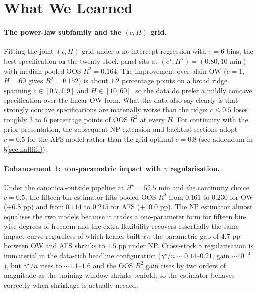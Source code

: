 \documentclass[11pt,a4paper]{article}
\begin{document}
\section{What We Learned}\label{sec:conc}

\paragraph{The power-law subfamily and the $(c, H)$ grid.}
Fitting the joint $(c, H)$ grid under a no-intercept regression with
$\tau = 6$ bins, the best specification on the twenty-stock panel sits
at $(c^\star, H^\star) = (0.80, 10 \text{ min})$ with median pooled OOS
$R^2 = 0.164$.  The improvement over plain OW ($c = 1$, $H = 60$ gives
$R^2 = 0.152$) is about $1.2$ percentage points on a broad ridge
spanning $c \in [0.7, 0.9]$ and $H \in [10, 60]$, so the data do
prefer a mildly concave specification over the linear OW form.  What
the data also say clearly is that strongly concave specifications are
materially worse than the ridge: $c \le 0.5$ loses roughly $3$ to $6$
percentage points of OOS $R^2$ at every $H$.  For continuity with the
prior presentation, the subsequent NP-extension and backtest sections
adopt $c = 0.5$ for the AFS model rather than the grid-optimal
$c = 0.8$ (see addendum in \S\ref{sec:halflife}).

\paragraph{Enhancement 1: non-parametric impact with $\gamma$ regularisation.}
Under the canonical-outside pipeline at $H^\star = 52.5$ min and the
continuity choice $c = 0.5$, the fifteen-bin estimator lifts pooled
OOS $R^2$ from $0.161$ to $0.230$ for OW ($+6.8$ pp) and from $0.114$
to $0.215$ for AFS ($+10.0$ pp).  The NP estimator almost equalises
the two models because it trades a one-parameter form for fifteen
bin-wise degrees of freedom and the extra flexibility recovers
essentially the same impact curve regardless of which kernel built
$x_t$; the parametric gap of $4.7$ pp between OW and AFS shrinks to
$1.5$ pp under NP.  Cross-stock $\gamma$ regularisation is immaterial
in the data-rich headline configuration ($\gamma^\star/n
\sim 0.14\text{--}0.21$, gain $\sim 10^{-4}$), but $\gamma^\star/n$
rises to $\sim 1.1\text{--}1.6$ and the OOS $R^2$ gain rises by two
orders of magnitude as the training window shrinks tenfold, so the
estimator behaves correctly when shrinkage is actually needed.
\end{document}
